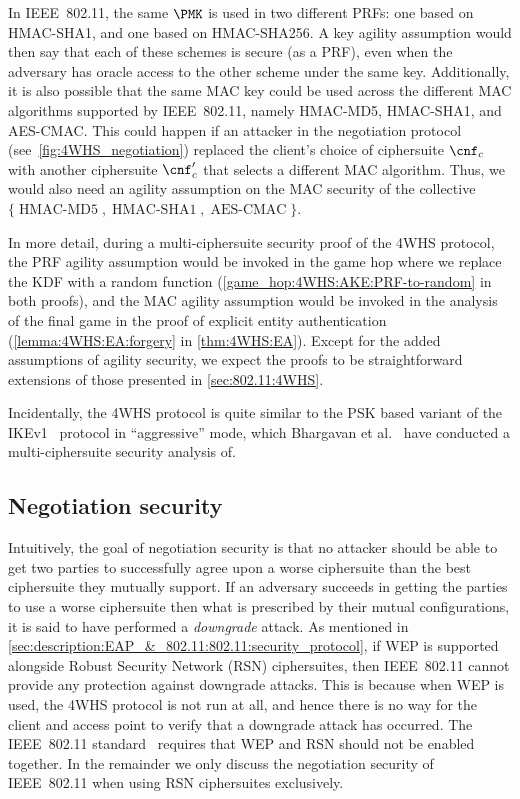 In IEEE~802.11, the same $\PMK$ is used in two different PRFs: 
one based on HMAC-SHA1,
and one based on HMAC-SHA256.
A key agility assumption would then say that each of these schemes is secure
(as a PRF),
even when the adversary has oracle access to the other scheme under the same key.
Additionally,
it is also possible that the same MAC key could be used across the different MAC algorithms supported by IEEE~802.11,
namely HMAC-MD5, HMAC-SHA1, and AES-CMAC.
This could happen if an attacker in the negotiation protocol (see~\cref{fig:4WHS_negotiation}) replaced the client's choice of ciphersuite $\cnf_c$ with another ciphersuite $\cnf_c'$ that selects a different MAC algorithm. 
Thus,
we would also need an agility assumption on the MAC security of the collective $\lbrace \operatorname{HMAC-MD5}, \operatorname{HMAC-SHA1}, \operatorname{AES-CMAC}  \rbrace$.


In more detail,
during a multi-ciphersuite security proof of the 4WHS protocol, the PRF agility assumption would be invoked in the game hop where we replace the KDF with a random function
(\cref{game_hop:4WHS:AKE:PRF-to-random} in both proofs),
and the MAC agility assumption would be invoked in the analysis of the final game in the proof of explicit entity authentication 
(\cref{lemma:4WHS:EA:forgery} in \cref{thm:4WHS:EA}).
Except for the added assumptions of agility security,
we expect the proofs to be straightforward extensions of those presented in \cref{sec:802.11:4WHS}. 


Incidentally,
the 4WHS protocol is quite similar to the PSK based variant of the IKEv1~\cite{IETF:RFC2409:IKEv1} protocol in ``aggressive'' mode,
which Bhargavan et al.~\cite{SP:BBFGKB16} have conducted a multi-ciphersuite security analysis of.



\subsection{Negotiation security}
Intuitively,
the goal of negotiation security is that no attacker should be able to get two parties to successfully agree upon a worse ciphersuite than the best ciphersuite they mutually support.
If an adversary succeeds in getting the parties to use a worse ciphersuite then what is prescribed by  their mutual configurations,
it is said to have performed a \emph{downgrade} attack.
As mentioned in \cref{sec:description:EAP_&_802.11:802.11:security_protocol},
if WEP is supported alongside Robust Security Network (RSN) ciphersuites,
then IEEE~802.11 cannot provide any protection against downgrade attacks.
This is because when WEP is used,
the 4WHS protocol is not run at all,
and hence there is no way for the client and access point to verify that a downgrade attack has occurred.
The IEEE~802.11 standard~\cite{IEEE:2012:802.11} requires that WEP and RSN should not be enabled together.
In the remainder we only discuss the negotiation security of IEEE~802.11 when using RSN ciphersuites exclusively.

